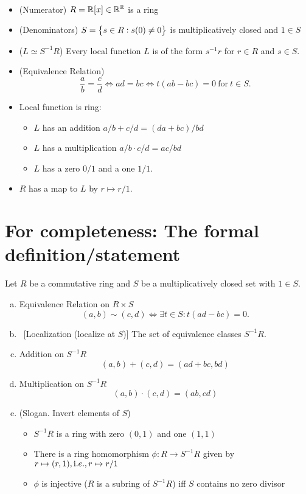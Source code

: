 \begin{note}
	\ \begin{itemize}
		\item (Numerator) $R=\mathbb{R}[x]\in\mathbb{R}^{\mathbb{R}}$ is a ring
		\item (Denominators) $S=\set{s\in R:s(0)\neq 0}$ is multiplicatively closed and $1\in S$
		\item ($L\simeq S^{-1}R$) Every local function $L$ is of the form $s^{-1}r$ for $r\in R$ and $s\in S$.
		\item (Equivalence Relation) \[
		\frac{a}{b}=\frac{c}{d}\iff ad=bc\iff t(ab-bc)=0\ \text{for}\ t\in S.
		\]
		\item Local function is ring: \begin{itemize}
			\item $L$ has an addition $a/b+c/d=(da+bc)/bd$
			\item $L$ has a multiplication $a/b\cdot c/d=ac/bd$
			\item $L$ has a zero $0/1$ and a one $1/1$.
		\end{itemize}
		\item $R$ has a map to $L$ by $r\mapsto r/1$.
	\end{itemize}
\end{note}

\section{For completeness: The formal definition/statement}
Let $R$ be a commutative ring and $S$ be a multiplicatively closed set with $1\in S$.
\begin{enumerate}[(a)]
	\item Equivalence Relation on $R\times S$ \[
	(a,b)\sim(c,d)\iff\exists t\in S:t(ad-bc)=0.
	\]
	\item \ [Localization (localize at $S$)] The set of equivalence classes $S^{-1}R$.
	\item Addition on $S^{-1}R$ \[
	(a,b)+(c,d)=(ad+bc, bd)
	\]
	\item Multiplication on $S^{-1}R$ \[
	(a,b)\cdot(c,d)=(ab,cd)
	\]
	\item (Slogan. Invert elements of $S$) \begin{itemize}
		\item $S^{-1}R$ is a ring with zero $(0,1)$ and one $(1,1)$
		\item There is a ring homomorphism $\phi:R\to S^{-1}R$ given by $r\mapsto (r,1),\textnormal i.e., r\mapsto r/1$
		\item $\phi$ is injective ($R$ is a subring of $S^{-1}R$) iff $S$ contains no zero divisor
	\end{itemize}
\end{enumerate}

